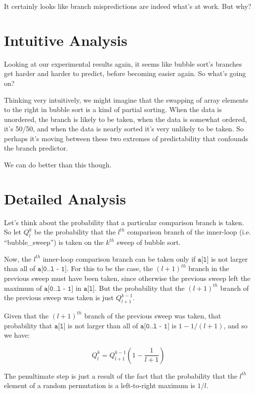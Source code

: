 \documentclass[11pt]{article}
\begin{document}
It certainly looks like branch mispredictions are indeed what's at work. But why?

\section{Intuitive Analysis}

Looking at our experimental results again, it seems like bubble sort's branches get harder and harder to predict, before becoming easier again. So what's going on?

Thinking very intuitively, we might imagine that the swapping of array elements to the right in bubble sort is a kind of partial sorting. When the data is unordered, the branch is likely to be taken, when the data is somewhat ordered, it's 50/50, and when the data is nearly sorted it's very unlikely to be taken. So perhaps it's moving between these two extremes of predictability that confounds the branch predictor.

We can do better than this though.

\section{Detailed Analysis}

Let's think about the probability that a particular comparison branch is taken. So let $Q^k_l$ be the probability that the $l^{th}$ comparison branch of the inner-loop (i.e. ``bubble\_sweep'') is taken on the $k^{th}$ sweep of bubble sort.

Now, the $l^{th}$ inner-loop comparison branch can be taken only if $\texttt{a[l]}$ is not larger than all of $\texttt{a[0..l - 1]}$. For this to be the case, the $(l + 1)^{th}$ branch in the previous sweep must have been taken, since otherwise the previous sweep left the maximum of $\texttt{a[0..l - 1]}$ in $\texttt{a[l]}$. But the probability that the $(l + 1)^{th}$ branch of the previous sweep was taken is just $Q^{k-1}_{l + 1}$.

Given that the $(l + 1)^{th}$ branch of the previous sweep was taken, that probability that $\texttt{a[l]}$ is not larger than all of $\texttt{a[0..l - 1]}$ is $1 - 1/(l + 1)$, and so we have:

\[ Q^k_l = Q^{k-1}_{l + 1}\left(1 - \frac{1}{l + 1}\right) \]

The penultimate step is just a result of the fact that the probability that the $l^{th}$ element of a random permutation is a left-to-right maximum is $1/l$.
\end{document}
